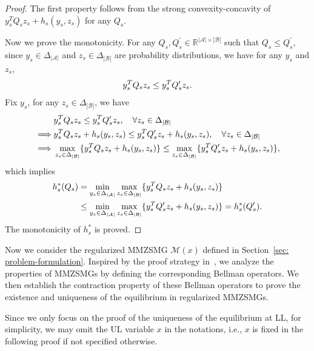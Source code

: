 \documentclass{article}
\theoremstyle{plain}
\theoremstyle{definition}
\theoremstyle{remark}
\def\cA{\mathcal A}
\def\cB{\mathcal B}
\def\cM{\mathcal M}
\begin{document}
\begin{proof}
    The first property follows from the strong convexity-concavity of $y_s^T Q_s z_s + h_s(y_s,z_s)$ for any $Q_s$.

    Now we prove the monotonicity.
    For any $Q_s, Q_s^\prime \in \mathbb{R}^{|\cA| \times |\cB|}$ such that $Q_s \le Q_s^\prime$, since $y_s \in \Delta_{|\cA|}$ and $z_s \in \Delta_{|\cB|}$ are probability distributions, we have for any $y_s$ and $z_s$,
    \begin{align}
        y_s^T Q_s z_s \le y_s^T Q_s^\prime z_s. \notag
    \end{align}
    Fix $y_s$, for any $z_s \in \Delta_{|\cB|}$, we have
    \begin{align}
        & y_s^T Q_s z_s \le y_s^T Q_s^\prime z_s , \quad \forall z_s \in \Delta_{|\cB|} \notag \\
         \implies &  y_s^T Q_s z_s + h_s(y_s,z_s) \le y_s^T Q_s^\prime z_s + h_s(y_s,z_s) , \quad \forall z_s \in \Delta_{|\cB|} \notag\\
         \implies & \max_{z_s \in \Delta_{|\cB|}} \{ y_s^T Q_s z_s + h_s(y_s,z_s) \} \le \max_{z_s \in \Delta_{|\cB|}} \{ y_s^T Q_s^\prime z_s + h_s(y_s,z_s) \}, 
    \end{align}
    which implies
    \begin{align}
        h^*_s(Q_s) & = \min_{y_s \in \Delta_{|\cA|}} \max_{z_s \in \Delta_{|\cB|}} \{ y_s^T Q_s z_s + h_s(y_s,z_s) \} \notag\\
        & \le \min_{y_s \in \Delta_{|\cA|}} \max_{z_s \in \Delta_{|\cB|}} \{ y_s^T Q_s^\prime z_s + h_s(y_s,z_s) \} = h^*_s(Q_s^\prime).
    \end{align}
    The monotonicity of $h^*_s$ is proved.
\end{proof}

Now we consider the regularized MMZSMG $\cM(x)$ defined in Section~\ref{sec: problem-formulation}. 
Inspired by the proof strategy in~\citet{geist2019theory}, we analyze the properties of MMZSMGs by defining the corresponding Bellman operators. We then establish the contraction property of these Bellman operators to prove the existence and uniqueness of the equilibrium in regularized MMZSMGs.

Since we only focus on the proof of the uniqueness of the equilibrium at LL, for simplicity, we may omit the UL variable $x$ in the notations, i.e., $x$ is fixed in the following proof if not specified otherwise.
\end{document}
